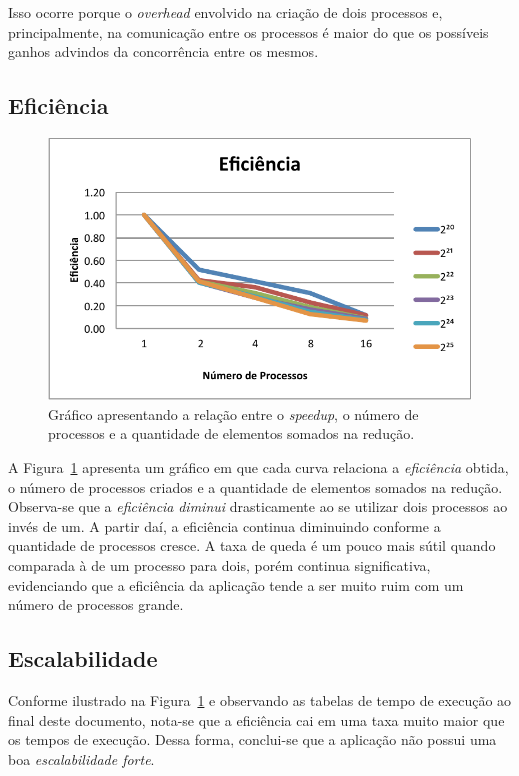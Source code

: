 \documentclass[12pt,a4paper]{article}
\begin{document}
Isso ocorre porque o \textit{overhead} envolvido na criação de dois processos e,
principalmente, na comunicação entre os processos é maior do que os possíveis
ganhos advindos da concorrência entre os mesmos.

\subsection{Eficiência}

\begin{figure}[h!]
\centering
\includegraphics{img/efficiency.pdf}
\caption{Gráfico apresentando a relação entre o \textit{speedup}, o número de
processos e a quantidade de elementos somados na redução.}
\label{fig:efficiency}
\end{figure}

A Figura~\ref{fig:efficiency} apresenta um gráfico em que cada curva relaciona a
\textit{eficiência} obtida, o número de processos criados e a quantidade de
elementos somados na redução. Observa-se que a \textit{eficiência}
\emph{diminui} drasticamente ao se utilizar dois processos ao invés de um. A
partir daí, a eficiência continua diminuindo conforme a quantidade de processos
cresce. A taxa de queda é um pouco mais sútil quando comparada à de um processo
para dois, porém continua significativa, evidenciando que a eficiência da
aplicação tende a ser muito ruim com um número de processos grande.

\subsection{Escalabilidade}

Conforme ilustrado na Figura~\ref{fig:efficiency} e observando as tabelas de
tempo de execução ao final deste documento, nota-se que a eficiência cai em uma
taxa muito maior que os tempos de execução. Dessa forma, conclui-se que a
aplicação não possui uma boa \emph{escalabilidade forte}.
\end{document}
